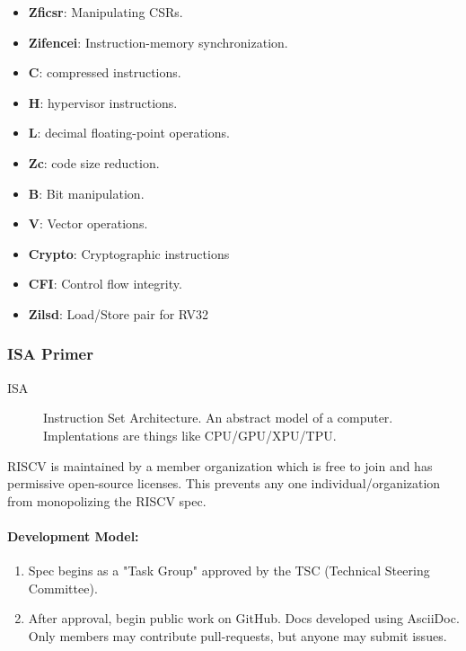 \documentclass[10pt,a4paper]{article}
\begin{document}
\begin{itemize}
          \item \textbf{Zficsr}: Manipulating CSRs.
          \item \textbf{Zifencei}: Instruction-memory synchronization.
          \item \textbf{C}: compressed instructions.
          \item \textbf{H}: hypervisor instructions.
          \item \textbf{L}: decimal floating-point operations.
          \item \textbf{Zc}: code size reduction.
          \item \textbf{B}: Bit manipulation.
          \item \textbf{V}: Vector operations.
          \item \textbf{Crypto}: Cryptographic instructions
          \item \textbf{CFI}: Control flow integrity.
          \item \textbf{Zilsd}: Load/Store pair for RV32
        \end{itemize}
      \subsubsection{ISA Primer}
        \begin{description}
          \item[ISA]
            Instruction Set Architecture. An abstract model of a computer. Implentations are things like CPU/GPU/XPU/TPU.
        \end{description}
        RISCV is maintained by a member organization which is free to join and has permissive open-source licenses. This prevents any one individual/organization from monopolizing the RISCV spec.
        \paragraph {Development Model:}
          \begin{enumerate}
            \item Spec begins as a "Task Group" approved by the TSC (Technical Steering Committee).
            \item After approval, begin public work on GitHub. Docs developed using AsciiDoc. Only members may contribute pull-requests, but anyone may submit issues.
          \end{enumerate}
\end{document}
